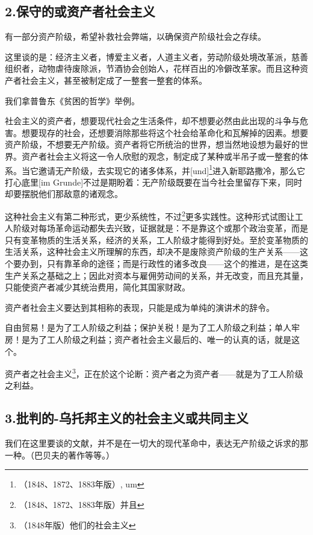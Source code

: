 \documentclass[a4paper,12pt]{ctexart}
\begin{document}

\subsection{2.保守的或资产者社会主义}

有一部分资产阶级，希望补救社会弊端，以确保资产阶级社会之存续。

这里谈的是：经济主义者，博爱主义者，人道主义者，劳动阶级处境改革派，慈善组织者，动物虐待废除派，节酒协会创始人，花样百出的冷僻改革家。而且这种资产者社会主义，甚至被制定成了一整套一整套的体系。

我们拿普鲁东《贫困的哲学》举例。

社会主义的资产者，想要现代社会之生活条件，却不想要必然由此出现的斗争与危害。想要现存的社会，还想要消除那些将这个社会给革命化和瓦解掉的因素。想要资产阶级，不想要无产阶级。资产者将它所统治的世界，想当然地设想为最好的世界。资产者社会主义将这一令人欣慰的观念，制定成了某种或半吊子或一整套的体系。当它邀请无产阶级，去实现它的诸多体系，并[und]\footnote{（1848、1872、1883年版）, um}进入新耶路撒冷，那么它打心底里[im Grunde]不过是期盼着：无产阶级既要在当今社会里留存下来，同时却要摆脱他们那敌意的诸观念。

这种社会主义有第二种形式，更少系统性，不过\footnote{（1848、1872、1883年版）并且}更多实践性。这种形式试图让工人阶级对每场革命运动都失去兴致，证据就是：不是靠这个或那个政治变革，而是只有变革物质的生活关系，经济的关系，工人阶级才能得到好处。至於变革物质的生活关系，这种社会主义所理解的东西，却决不是废除资产阶级的生产关系——这个要办到，只有靠革命的途径；而是行政性的诸多改良——这个的推进，是在这类生产关系之基础之上；因此对资本与雇佣劳动间的关系，并无改变，而且充其量，只能使资产者减少其统治费用，简化其国家财政。

资产者社会主义要达到其相称的表现，只能是成为单纯的演讲术的辞令。

自由贸易！是为了工人阶级之利益；保护关税！是为了工人阶级之利益；单人牢房！是为了工人阶级之利益；资产者社会主义最后的、唯一的认真的话，就是这个。

资产者之社会主义\footnote{（1848年版）他们的社会主义}，正在於这个论断：资产者之为资产者——就是为了工人阶级之利益。


\subsection{3.批判的-乌托邦主义的社会主义或共同主义}

我们在这里要谈的文献，并不是在一切大的现代革命中，表达无产阶级之诉求的那一种。（巴贝夫的著作等等。）
\end{document}
